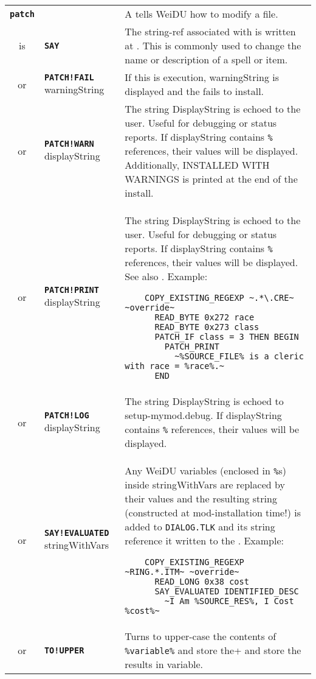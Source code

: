 \documentclass{article}
\def\ttref#1{\ahrefloc{#1}{\tt #1}}
\def\DEFINE#1{{\tt \bf #1}\label{#1}\index{#1}}
\def\DEFSYN#1{{\tt \bf #1}\index{#1}}
\def\t#1{{\tt #1}}
\begin{document}
\begin{tabular}{cp{10in}|p{10in}}
\DEFINE{patch} & & A \ttref{patch} tells WeiDU how to modify a file.  \\
is & \DEFSYN{SAY} \ttref{offset} \ttref{String} &
  The string-ref associated with \ttref{String} is written at
  \ttref{offset}. This is commonly used to change the name or
  description of a spell or item. \\
  or & \DEFINE{PATCH!FAIL} warningString &
    If this \ttref{TP2 Action} is execution, warningString is displayed and
    the \ttref{component} fails to install. \\
  or & \DEFINE{PATCH!WARN} displayString &
    The string DisplayString is echoed to the user. Useful for debugging or
    status reports. If displayString contains \t{\%}\ttref{variable}\t{\%}
    references, their values will be displayed. Additionally, INSTALLED WITH
    WARNINGS is printed at the end of the install.
    \\
  or & \DEFINE{PATCH!PRINT} displayString & 
  The string DisplayString is echoed to the user. Useful for debugging or
  status reports. If displayString contains \t{\%}\ttref{variable}\t{\%}
  references, their values will be displayed. See also \ttref{PRINT}.
  Example: 
  \begin{verbatim}
    COPY_EXISTING_REGEXP ~.*\.CRE~ ~override~
      READ_BYTE 0x272 race
      READ_BYTE 0x273 class
      PATCH_IF class = 3 THEN BEGIN
        PATCH_PRINT
          ~%SOURCE_FILE% is a cleric with race = %race%.~
      END 
  \end{verbatim} \\
  or & \DEFINE{PATCH!LOG} displayString &
    The string DisplayString is echoed to setup-mymod.debug.
    If displayString contains \t{\%}\ttref{variable}\t{\%}
    references, their values will be displayed. \\
or & \DEFINE{SAY!EVALUATED} \ttref{offset} stringWithVars & 
  Any WeiDU variables (enclosed in \t{\%}s) inside stringWithVars are
  replaced by their values and the resulting string (constructed at
  mod-installation time!) is added to \t{DIALOG.TLK} and its string
  reference it written to the \ttref{offset}. Example:
  \begin{verbatim}
    COPY_EXISTING_REGEXP ~RING.*.ITM~ ~override~
      READ_LONG 0x38 cost 
      SAY_EVALUATED IDENTIFIED_DESC
        ~I Am %SOURCE_RES%, I Cost %cost%~
  \end{verbatim} \\
or & \DEFINE{TO!UPPER} \ttref{variable} &
  Turns to upper-case the contents of \verb+%variable%+ and store the
  results in variable. \\

\end{tabular}
\end{document}
